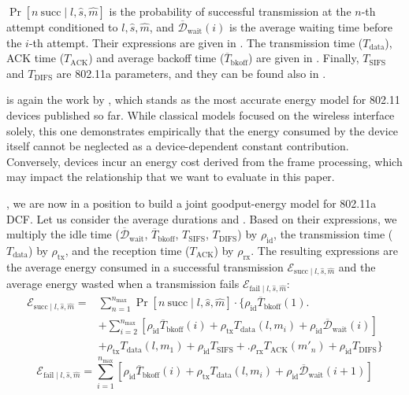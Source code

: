 \documentclass[twoside,nohyper]{tufte-book}
\makeatletter
\let\orig@maketag@@@\maketag@@@
\renewcommand{\eqref}[1]{\textup{\let\maketag@@@\orig@maketag@@@\tagform@{\ref{#1}}}}
\def\maketag@@@#1{\hbox{\rlap{\kern\marginparsep\m@th\normalfont#1}\kern1sp}}
\makeatother
\begin{document}
\(\Pr[n \mathrm{~succ} \mid l, \hat{s}, \hat{m}]\) is the probability of successful transmission at the \(n\)-th attempt conditioned to \(l, \hat{s}, \hat{m}\), and \(\overline{\mathcal{D}}_\mathrm{wait}(i)\) is the average waiting time before the \(i\)-th attempt. Their expressions are given in \citet[Equations (7)--(8)]{Qiao2002}. The transmission time (\(T_\mathrm{data}\)), ACK time (\(T_\mathrm{ACK}\)) and average backoff time (\(\overline{T}_\mathrm{bkoff}\)) are given in \citet[Equations (1)--(3)]{Qiao2002}. Finally, \(T_\mathrm{SIFS}\) and \(T_\mathrm{DIFS}\) are 802.11a parameters, and they can be found also in \citet[Table 2]{Qiao2002}.

 is again the work by \citet{Serrano2014}\cite{Serrano2014}, which stands as the most accurate energy model for 802.11 devices published so far. While classical models focused on the wireless interface solely, this one demonstrates empirically that the energy consumed by the device itself cannot be neglected as a device-dependent constant contribution. Conversely, devices incur an energy cost derived from the frame processing, which may impact the relationship that we want to evaluate in this paper.

, we are now in a position to build a joint goodput-energy model for 802.11a DCF. Let us consider the average durations \eqref{eq:Dsucc} and \eqref{eq:Dfail}. Based on their expressions, we multiply the idle time (\(\overline{\mathcal{D}}_\mathrm{wait}\), \(\overline{T}_\mathrm{bkoff}\), \(T_\mathrm{SIFS}\), \(T_\mathrm{DIFS}\)) by \(\rho_\mathrm{id}\), the transmission time (\(T_\mathrm{data}\)) by \(\rho_\mathrm{tx}\), and the reception time (\(T_\mathrm{ACK}\)) by \(\rho_\mathrm{rx}\). The resulting expressions are the average energy consumed in a successful transmission \(\mathcal{E}_{\mathrm{succ} \mid l, \hat{s}, \hat{m}}\) and the average energy wasted when a transmission fails \(\mathcal{E}_{\mathrm{fail} \mid l, \hat{s}, \hat{m}}\):
%
\begin{equation}
\begin{split}
 \mathcal{E}_{\mathrm{succ} \mid l, \hat{s}, \hat{m}} = &\sum_{n=1}^{n_\mathrm{max}} \Pr[n \mathrm{~succ} \mid l, \hat{s}, \hat{m}] \cdot \biggl\lbrace \rho_\mathrm{id}\overline{T}_\mathrm{bkoff}(1) \biggr. \\
 &+ \sum_{i=2}^{n_\mathrm{max}} \left[\rho_\mathrm{id}\overline{T}_\mathrm{bkoff}(i)\right.+ \left.\rho_\mathrm{tx}T_\mathrm{data}(l, m_i) + \rho_\mathrm{id}\overline{\mathcal{D}}_\mathrm{wait}(i)\right] \\
 &+ \rho_\mathrm{tx}T_\mathrm{data}(l, m_1) + \rho_\mathrm{id}T_\mathrm{SIFS} + \biggl.\rho_\mathrm{rx}T_\mathrm{ACK}(m'_n) + \rho_\mathrm{id}T_\mathrm{DIFS} \biggr\rbrace
\end{split}
\label{eq:Esucc}
\end{equation}
%
\begin{equation}
 \mathcal{E}_{\mathrm{fail} \mid l, \hat{s}, \hat{m}} = \sum_{i=1}^{n_\mathrm{max}} \left[\rho_\mathrm{id}\overline{T}_\mathrm{bkoff}(i) + \rho_\mathrm{tx}T_\mathrm{data}(l, m_i) + \rho_\mathrm{id}\overline{\mathcal{D}}_\mathrm{wait}(i+1)\right]
\label{eq:Efail}
\end{equation}
%
\end{document}
